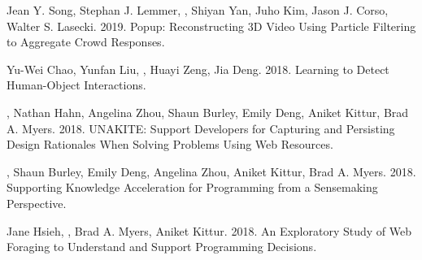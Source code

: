 

\begin{cvpubs}
{Jean Y. Song, Stephan J. Lemmer, , Shiyan Yan, Juho Kim, Jason J. Corso, Walter S. Lasecki. 2019. Popup: Reconstructing 3D Video Using Particle Filtering to Aggregate Crowd Responses. } %

{Yu-Wei Chao, Yunfan Liu, , Huayi Zeng, Jia Deng. 2018. Learning to Detect Human-Object Interactions. } %
\end{cvpubs}


\begin{cvpubs}
{, Nathan Hahn, Angelina Zhou, Shaun Burley, Emily Deng, Aniket Kittur, Brad A. Myers. 2018. UNAKITE: Support Developers for Capturing and Persisting Design Rationales When Solving Problems Using Web Resources. } %

{, Shaun Burley, Emily Deng, Angelina Zhou, Aniket Kittur, Brad A. Myers. 2018. Supporting Knowledge Acceleration for Programming from a Sensemaking Perspective. } %
\end{cvpubs}



\begin{cvpubs}
{Jane Hsieh, , Brad A. Myers, Aniket Kittur. 2018. An Exploratory Study of Web Foraging to Understand and Support Programming Decisions. } %
\end{cvpubs}
